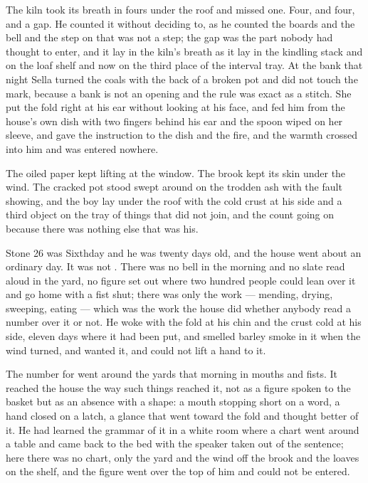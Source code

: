 The kiln took its breath in fours under the roof and missed one. Four, and four, and a gap. He counted it without deciding to, as he counted the boards and the bell and the step on  that was not a step; the gap was the part nobody had thought to enter, and it lay in the kiln's breath as it lay in the kindling stack and on the loaf shelf and now on the third place of the interval tray. At the bank that night Sella turned the coals with the back of a broken pot and did not touch the mark, because a bank is not an opening and the rule was exact as a stitch. She put the fold right at his ear without looking at his face, and fed him from the house's own dish with two fingers behind his ear and the spoon wiped on her sleeve, and gave the instruction to the dish and the fire, and the warmth crossed into him and was entered nowhere.

The oiled paper kept lifting at the window. The brook kept its skin under the wind. The cracked pot stood swept around on the trodden ash with the fault showing, and the boy lay under the roof with the cold crust at his side and a third object on the tray of things that did not join, and the count going on because there was nothing else that was his.

\scenebreak


Stone 26 was Sixthday and he was twenty days old, and the house went about an ordinary day. It was not . There was no bell in the morning and no slate read aloud in the yard, no figure set out where two hundred people could lean over it and go home with a fist shut; there was only the work --- mending, drying, sweeping, eating --- which was the work the house did whether anybody read a number over it or not. He woke with the fold at his chin and the crust cold at his side, eleven days where it had been put, and smelled barley smoke in it when the wind turned, and wanted it, and could not lift a hand to it.

The number for  went around the yards that morning in mouths and fists. It reached the house the way such things reached it, not as a figure spoken to the basket but as an absence with a shape: a mouth stopping short on a word, a hand closed on a latch, a glance that went toward the fold and thought better of it. He had learned the grammar of it in a white room where a chart went around a table and came back to the bed with the speaker taken out of the sentence; here there was no chart, only the yard and the wind off the brook and the loaves on the shelf, and the figure went over the top of him and could not be entered.

